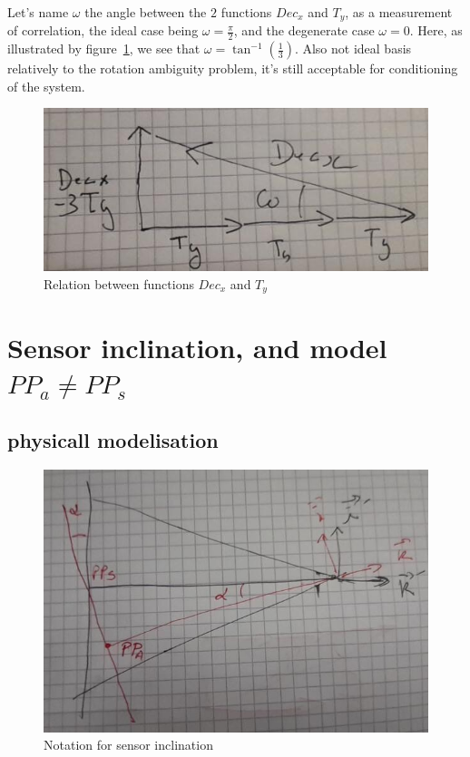 Let's name $\omega$ the angle between the $2$ functions  $Dec_x$ and $T_y$,  as a measurement of correlation, the ideal case being
$\omega=\frac{\pi}{2}$, and the degenerate case $\omega=0$.  Here, as illustrated by
figure~\ref{fig:DecTy}, we see that $\omega=\tan^{-1}({\frac13})$. Also not ideal basis relatively to
the rotation ambiguity problem, it's still acceptable for conditioning of the system.

\begin{figure}
\centering
	\includegraphics[width=12cm]{Methods/Images/DecxTy.jpg}\caption{Relation between functions $Dec_x$ and $T_y$}
	\label{fig:DecTy}
\end{figure}





\section{Sensor inclination, and  model $PP_a\neq PP_s$ }
\label{SenIncl}


\subsection{physicall modelisation}

\begin{figure}
\centering
\includegraphics[width=12cm]{Methods/Images/Plan_Incl_PPaPPs.jpg} \caption{Notation for sensor inclination}
	\label{fig:PlaneIncl}
\end{figure}

